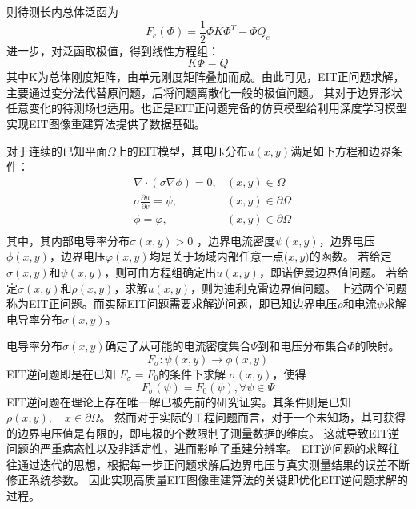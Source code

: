 则待测长内总体泛函为
\boldmath
\begin{equation}
  F_e(\Phi) = \frac{1}{2} \Phi K \Phi^T - \Phi Q_e
\end{equation}
\unboldmath
进一步，对泛函取极值，得到线性方程组：
\boldmath
\begin{equation}
  K\Phi = Q
\end{equation}
\unboldmath
其中K为总体刚度矩阵，由单元刚度矩阵叠加而成\cite{2019d_cc}。由此可见，EIT正问题求解，主要通过变分法代替原问题，后将问题离散化一般的极值问题。
其对于边界形状任意变化的待测场也适用。也正是EIT正问题完备的仿真模型给利用深度学习模型实现EIT图像重建算法提供了数据基础。

对于连续的已知平面$\Omega$上的EIT模型，其电压分布$u(x,y)$满足如下方程和边界条件：
\begin{equation}
  \begin{aligned}
  &\nabla \cdot (\sigma \nabla \phi) = 0, &(x, y)\in {\Omega} \\
  &\sigma\frac{\partial{u}}{\partial{v}} = \psi, &(x,y) \in {\partial{\Omega}} \\
  &\phi = \varphi, &(x,y)\in\partial{\Omega} \\
\end{aligned}
\end{equation}
其中，其内部电导率分布$\sigma(x,y) > 0$ ，边界电流密度$\psi(x,y)$，边界电压$\phi(x,y)$，边界电压$\varphi(x,y)$均是关于场域内部任意一点($x,y)$的函数。
若给定$\sigma(x,y)$和$\psi(x,y)$，则可由方程组确定出$u(x,y)$，即诺伊曼边界值问题。
若给定$\sigma(x,y)$和$\rho(x,y)$，求解$u(x,y)$，则为迪利克雷边界值问题。
上述两个问题称为EIT正问题。而实际EIT问题需要求解逆问题，即已知边界电压$\rho$和电流$\psi$求解电导率分布$\sigma(x,y)$。

电导率分布$\sigma(x,y)$确定了从可能的电流密度集合$\Psi$到和电压分布集合$\Phi$的映射。
\begin{equation}
  F_\sigma: \psi(x,y) \rightarrow \phi(x,y)
\end{equation}
EIT逆问题即是在已知 $F_{\sigma} = F_0$的条件下求解 $\sigma(x,y)$，使得
\begin{equation}
  F_{\sigma}(\psi) = F_{0}(\psi),  \forall \psi \in \Psi
\end{equation}
EIT逆问题在理论上存在唯一解已被先前的研究证实\cite{Sun1993An}。其条件则是已知$\rho(x,y),\quad x \in \partial \Omega$。
然而对于实际的工程问题而言，对于一个未知场，其可获得的边界电压值是有限的，即电极的个数限制了测量数据的维度。
这就导致EIT逆问题的严重病态性以及非适定性，进而影响了重建分辨率。
EIT逆问题的求解往往通过迭代的思想，根据每一步正问题求解后边界电压与真实测量结果的误差不断修正系统参数。
因此实现高质量EIT图像重建算法的关键即优化EIT逆问题求解的过程。

